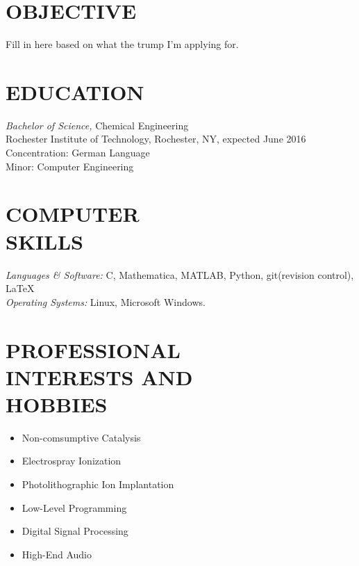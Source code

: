 \documentclass[line,margin]{res}
\begin{document}
\address{3241 Nathaniel Rochester Hall, Rochester, NY 14623}
\address{(315) 391-7268}

\begin{resume}
 
\section{OBJECTIVE}       Fill in here based on what the trump I'm applying for. 
 
 
\section{EDUCATION} {\sl Bachelor of Science,} Chemical Engineering \\
                Rochester Institute of Technology, Rochester, NY, 
                expected June 2016 \\
                Concentration: German Language \\
                Minor: Computer Engineering
 
 
\section{COMPUTER \\ SKILLS} {\sl Languages \& Software:} C, Mathematica,
						MATLAB, Python, git(revision control), \LaTeX\\
                {\sl Operating Systems:} Linux, Microsoft Windows.

\section{PROFESSIONAL \\ INTERESTS AND \\ HOBBIES}
				\begin{itemize} \itemsep -2pt
				\item	Non-comsumptive Catalysis
				\item	Electrospray Ionization
				\item	Photolithographic Ion Implantation
				\item	Low-Level Programming
				\item	Digital Signal Processing
				\item	High-End Audio
				\end{itemize}
 

\end{resume}
\end{document}
